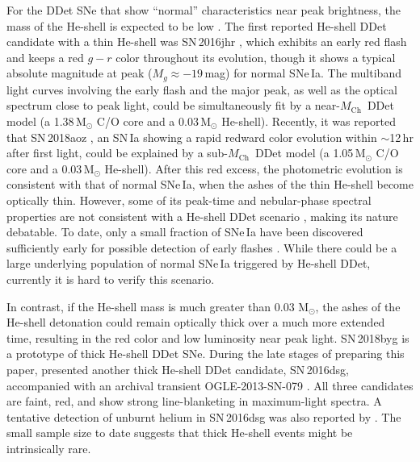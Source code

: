 \documentclass[twocolumn]{aastex631}
\newcommand{\Mch}{$M_\mathrm{Ch}$}
\begin{document}
For the DDet SNe that show ``normal'' characteristics near peak brightness, the mass of the He-shell is expected to be low \citep[$\lesssim$0.03\,$\mathrm{M_\odot}$;][]{Kromer_DD_2010,Sim_2010,Shen_DD_2018,polin_observational_2019}. The first reported He-shell DDet candidate with a thin He-shell was SN\,2016jhr \citep{jiang_16jhr_2017}, which exhibits an early red flash and keeps a red $g-r$ color throughout its evolution, though it shows a typical absolute magnitude at peak ($M_g\approx-19$\,mag) for normal SNe\,Ia. The multiband light curves involving the early flash and the major peak, as well as the optical spectrum close to peak light, could be simultaneously fit by a near-\Mch\ DDet model (a 1.38\,$\mathrm{M_\odot}$ C/O core and a 0.03\,$\mathrm{M_\odot}$ He-shell). Recently, it was reported that SN\,2018aoz \citep{Ni_2022}, an SN\,Ia showing a rapid redward color evolution within $\sim$12\,hr after first light, could be explained by a sub-\Mch\ DDet model (a 1.05\,$\mathrm{M_\odot}$ C/O core and a 0.03\,$\mathrm{M_\odot}$ He-shell). After this red excess, the photometric evolution is consistent with that of normal SNe\,Ia, when the ashes of the thin He-shell become optically thin. However, some of its peak-time and nebular-phase spectral properties are not consistent with a He-shell DDet scenario \citep{Ni_2022b}, making its nature debatable. To date, only a small fraction of SNe\,Ia have been discovered sufficiently early for possible detection of early flashes \citep[e.g.,][]{Deckers_2022}. While there could be a large underlying population of normal SNe\,Ia triggered by He-shell DDet, currently it is hard to verify this scenario.

In contrast, if the He-shell mass is much greater than 0.03\,$\,\mathrm{M_\odot}$, the ashes of the He-shell detonation could remain optically thick over a much more extended time, resulting in the red color and low luminosity near peak light. SN\,2018byg \citep{de_18byg_2019} is a prototype of thick He-shell DDet SNe. During the late stages of preparing this paper, \citet{Dong_16dsg_2022} presented another thick He-shell DDet candidate, SN\,2016dsg, accompanied with an archival transient OGLE-2013-SN-079 \citep{Inserra_OGLE13_079_2015}. All three candidates are faint, red, and show strong line-blanketing in maximum-light spectra. A tentative detection of unburnt helium in SN\,2016dsg was also reported by \citet{Dong_16dsg_2022}. The small sample size to date suggests that thick He-shell events might be intrinsically rare.
\end{document}

